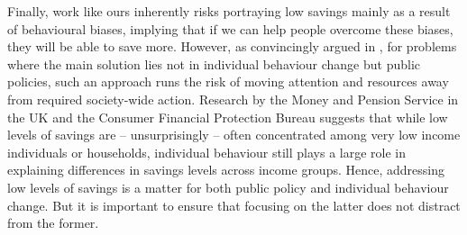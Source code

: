 Finally, work like ours inherently risks portraying low savings mainly as a
result of behavioural biases, implying that if we can help people overcome these
biases, they will be able to save more. However, as convincingly argued in
\citet{chater2022frame}, for problems where the main solution lies not in
individual behaviour change but public policies, such an approach runs the risk
of moving attention and resources away from required society-wide action.
Research by the Money and Pension Service in the UK \citep{mps2018building} and
the Consumer Financial Protection Bureau \citep{cfpb2017financial} suggests
that while low levels of savings are -- unsurprisingly -- often concentrated
among very low income individuals or households, individual behaviour still
plays a large role in explaining differences in savings levels across income
groups. Hence, addressing low levels of savings is a matter for both public
policy and individual behaviour change. But it is important to ensure that
focusing on the latter does not distract from the former.
